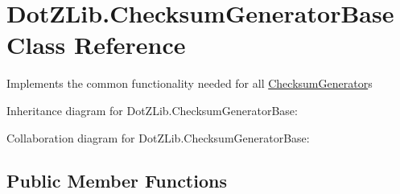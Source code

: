 \hypertarget{class_dot_z_lib_1_1_checksum_generator_base}{\section{Dot\+Z\+Lib.\+Checksum\+Generator\+Base Class Reference}
\label{class_dot_z_lib_1_1_checksum_generator_base}
}


Implements the common functionality needed for all \hyperlink{interface_dot_z_lib_1_1_checksum_generator}{Checksum\+Generator}s  




Inheritance diagram for Dot\+Z\+Lib.\+Checksum\+Generator\+Base\+:


Collaboration diagram for Dot\+Z\+Lib.\+Checksum\+Generator\+Base\+:
\subsection*{Public Member Functions}
